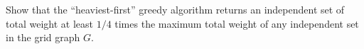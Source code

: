 






Show that the “heaviest-first” greedy algorithm returns an independent set of total weight at least $1/4$ times the maximum total weight of any independent set in the grid graph $G$.
















